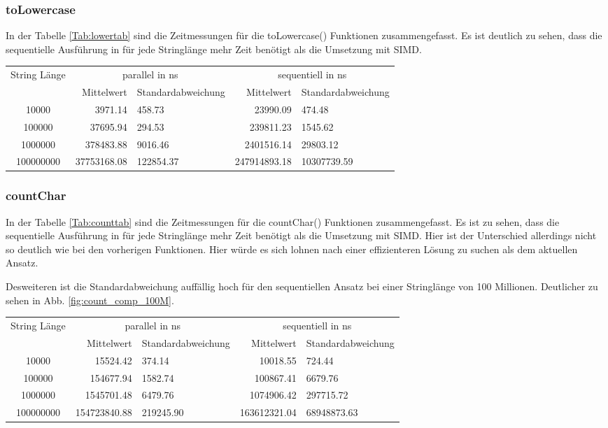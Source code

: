 \documentclass[plainarticle,zihtitle,german,final,hyperref,utf8]{zihpub}
\begin{document}
\subsubsection{toLowercase}
In der Tabelle \ref{Tab:lowertab} sind die Zeitmessungen für die toLowercase() Funktionen zusammengefasst.
Es ist deutlich zu sehen, dass die sequentielle Ausführung in für jede Stringlänge mehr Zeit benötigt als die Umsetzung mit SIMD.
\newline
\begin{tabular}{|c|r|l|r|l|}
	\hline
	\multicolumn{1}{|c|}{String Länge} & \multicolumn{2}{c|}{parallel in ns} & \multicolumn{2}{c|}{sequentiell in ns} \\
	\cline{2-5}
	& Mittelwert & Standardabweichung  & Mittelwert & Standardabweichung \\
	\hline
	10000 & 3971.14 & 458.73 & 23990.09 & 474.48 \\
	100000 & 37695.94 & 294.53 & 239811.23 & 1545.62 \\
	1000000 & 378483.88 & 9016.46 & 2401516.14 & 29803.12 \\
	100000000 & 37753168.08 & 122854.37 & 247914893.18 & 10307739.59 \\
	\hline
\end{tabular}
\label{Tab:lowertab}

\subsubsection{countChar}
In der Tabelle \ref{Tab:counttab} sind die Zeitmessungen für die countChar() Funktionen zusammengefasst.
Es ist zu sehen, dass die sequentielle Ausführung in für jede Stringlänge mehr Zeit benötigt als die Umsetzung mit SIMD. Hier ist der Unterschied allerdings nicht so deutlich wie bei den vorherigen Funktionen. Hier würde es sich lohnen nach einer effizienteren Lösung zu suchen als dem aktuellen Ansatz.

Desweiteren ist die Standardabweichung auffällig hoch für den sequentiellen Ansatz bei einer Stringlänge von 100 Millionen. Deutlicher zu sehen in Abb. \ref{fig:count_comp_100M}.
\newline
\begin{tabular}{|c|r|l|r|l|}
	\hline
	\multicolumn{1}{|c|}{String Länge} & \multicolumn{2}{c|}{parallel in ns} & \multicolumn{2}{c|}{sequentiell in ns} \\
	\cline{2-5}
	& Mittelwert & Standardabweichung  & Mittelwert & Standardabweichung \\
	\hline
	10000 & 15524.42 & 374.14 & 10018.55 & 724.44 \\
	100000 & 154677.94 & 1582.74 & 100867.41 & 6679.76 \\
	1000000 & 1545701.48 & 6479.76 & 1074906.42 & 297715.72 \\
	100000000 & 154723840.88 & 219245.90 & 163612321.04 & 68948873.63 \\
	\hline
\end{tabular}
\label{Tab:counttab}
\end{document}
